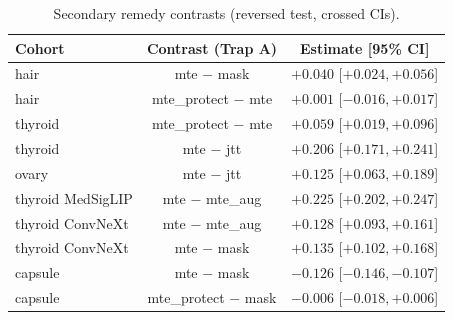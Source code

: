 \begin{table}[H]\centering\scriptsize
\caption{Secondary remedy contrasts (reversed test, crossed CIs).}\label{tab:supp}
\begin{tabular}{lcc}\toprule
Cohort & Contrast (Trap A) & Estimate [95\% CI] \\\midrule
hair & mte $-$ mask & $+0.040$ [$+0.024, +0.056$] \\
hair & mte\_protect $-$ mte & $+0.001$ [$-0.016, +0.017$] \\
thyroid & mte\_protect $-$ mte & $+0.059$ [$+0.019, +0.096$] \\
thyroid & mte $-$ jtt & $+0.206$ [$+0.171, +0.241$] \\
ovary & mte $-$ jtt & $+0.125$ [$+0.063, +0.189$] \\
thyroid MedSigLIP & mte $-$ mte\_aug & $+0.225$ [$+0.202, +0.247$] \\
thyroid ConvNeXt & mte $-$ mte\_aug & $+0.128$ [$+0.093, +0.161$] \\
thyroid ConvNeXt & mte $-$ mask & $+0.135$ [$+0.102, +0.168$] \\
capsule & mte $-$ mask & $-0.126$ [$-0.146, -0.107$] \\
capsule & mte\_protect $-$ mask & $-0.006$ [$-0.018, +0.006$] \\
\bottomrule\end{tabular}
\end{table}
